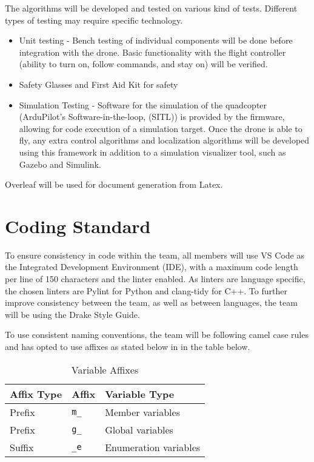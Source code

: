 \documentclass{article}
\begin{document}
The algorithms will be developed and tested on various kind of tests. Different types of testing may require specific technology.
\begin{itemize}
    \item Unit testing - Bench testing of individual components will be done before integration with the drone. Basic functionality with the flight controller (ability to turn on, follow commands, and stay on) will be verified. 
    \item Safety Glasses and First Aid Kit for safety
    \item Simulation Testing - Software for the simulation of the quadcopter (ArduPilot's Software-in-the-loop, (SITL)) is provided by the firmware, allowing for code execution of a simulation target. Once the drone is able to fly, any extra control algorithms and localization algorithms will be developed using this framework in addition to a simulation visualizer tool, such as Gazebo and Simulink. 
\end{itemize}


Overleaf will be used for document generation from Latex.


\section{Coding Standard}
\label{sec:codingStandard}
To ensure consistency in code within the team, all members will use VS Code as the Integrated Development Environment (IDE), with a maximum code length per line of 150 characters and the linter enabled. As linters are language specific, the chosen linters are Pylint for Python and clang-tidy for C++. To further improve consistency between the team, as well as between languages, the team will be using the Drake Style Guide. 

To use consistent naming conventions, the team will be following camel case rules and has opted to use affixes as stated below in in the table below.

\begin{table}[h]
\begin{center}
\caption {Variable Affixes} \label{tab:title}
\begin{tabular}{ | m{4cm} | m{4cm} | m{4cm} |} 
    \hline
     Affix Type & Affix & Variable Type\\ 
    \hline
     Prefix & \texttt{m\_}& Member variables\\ 
    \hline
     Prefix & \texttt{g\_} & Global variables\\
     \hline
     Suffix & \texttt{\_e} & Enumeration variables\\
     \hline
\end{tabular}
\end{center}
\end{table}
\end{document}
